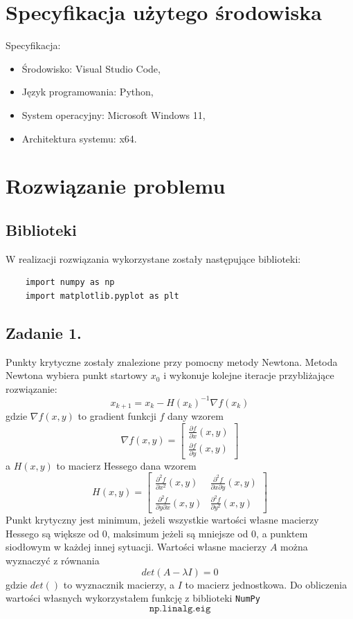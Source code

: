 \documentclass[11pt, leqno]{scrartcl}
\begin{document}
    \section{Specyfikacja użytego środowiska}
    Specyfikacja:
    \begin{itemize}
        \item Środowisko: Visual Studio Code,
        \item Język programowania: Python,
        \item System operacyjny: Microsoft Windows 11,
        \item Architektura systemu: x64.
    \end{itemize}

    \section{Rozwiązanie problemu}
    \subsection{Biblioteki}
    W realizacji rozwiązania wykorzystane zostały następujące
    biblioteki:
    \begin{lstlisting}
    import numpy as np
    import matplotlib.pyplot as plt
    \end{lstlisting}

    \subsection{Zadanie 1.}
    Punkty krytyczne zostały znalezione przy pomocny metody Newtona.
    Metoda Newtona wybiera punkt startowy $x_0$ i wykonuje kolejne
    iteracje przybliżające rozwiązanie:
    \[
        x_{k+1}=x_k-H(x_k)^{-1}\nabla f(x_k)
    \]
    gdzie $\nabla f(x,y)$ to gradient funkcji $f$ dany wzorem
    \[
        \nabla f(x,y)=
        \begin{bmatrix}
            \frac{\partial f}{\partial x}(x,y) \\
            \frac{\partial f}{\partial y}(x,y)
        \end{bmatrix}
    \]
    a $H(x,y)$ to macierz Hessego dana wzorem
    \[
        H(x,y)=
        \begin{bmatrix}
            \frac{\partial ^2f}{\partial x^2}(x,y) &
                \frac{\partial ^2f}{\partial x\partial y}(x,y) \\
            \frac{\partial ^2f}{\partial y\partial x}(x,y) &
            \frac{\partial ^2f}{\partial y^2}(x,y)
        \end{bmatrix}
    \]
    Punkt krytyczny jest minimum, jeżeli wszystkie wartości własne
    macierzy Hessego są większe od 0, maksimum jeżeli są mniejsze od
    0, a punktem siodłowym w każdej innej sytuacji. Wartości własne
    macierzy $A$ można wyznaczyć z równania
    \[
        det(A-\lambda I)=0
    \]
    gdzie $det()$ to wyznacznik macierzy, a $I$ to macierz
    jednostkowa. Do obliczenia wartości własnych wykorzystałem
    funkcję z biblioteki \texttt{NumPy}
    \[
        \texttt{np.linalg.eig}
    \]
\end{document}
